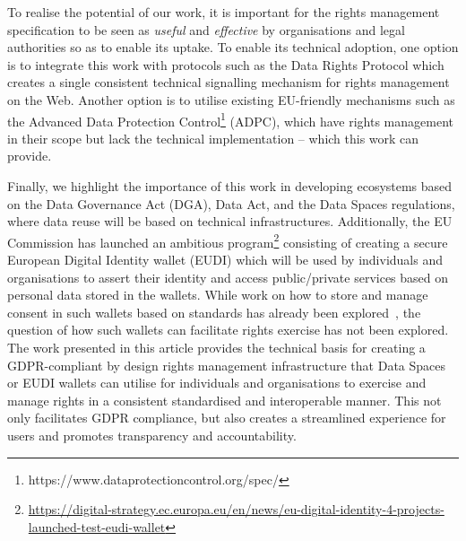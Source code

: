 \documentclass{IOS-Book-Article}     %
\begin{document}
To realise the potential of our work, it is important for the rights management specification to be seen as \textit{useful} and \textit{effective} by organisations and legal authorities so as to enable its uptake. To enable its technical adoption, one option is to integrate this work with protocols such as the Data Rights Protocol which creates a single consistent technical signalling mechanism for rights management on the Web. Another option is to utilise existing EU-friendly mechanisms such as the Advanced Data Protection Control\footnote{https://www.dataprotectioncontrol.org/spec/} (ADPC), which have rights management in their scope but lack the technical implementation -- which this work can provide. 

Finally, we highlight the importance of this work in developing ecosystems based on the Data Governance Act (DGA), Data Act, and the Data Spaces regulations, where data reuse will be based on technical infrastructures.
Additionally, the EU Commission has launched an ambitious program\footnote{\url{https://digital-strategy.ec.europa.eu/en/news/eu-digital-identity-4-projects-launched-test-eudi-wallet}} consisting of creating a secure European Digital Identity wallet (EUDI) which will be used by individuals and organisations to assert their identity and access public/private services based on personal data stored in the wallets.
While work on how to store and manage consent in such wallets based on standards has already been explored~\cite{pandit2024implementing}, the question of how such wallets can facilitate rights exercise has not been explored. 
The work presented in this article provides the technical basis for creating a GDPR-compliant by design rights management infrastructure that Data Spaces or EUDI wallets can utilise for individuals and organisations to exercise and manage rights in a consistent standardised and interoperable manner. This not only facilitates GDPR compliance, but also creates a streamlined experience for users and promotes transparency and accountability.



\end{document}
